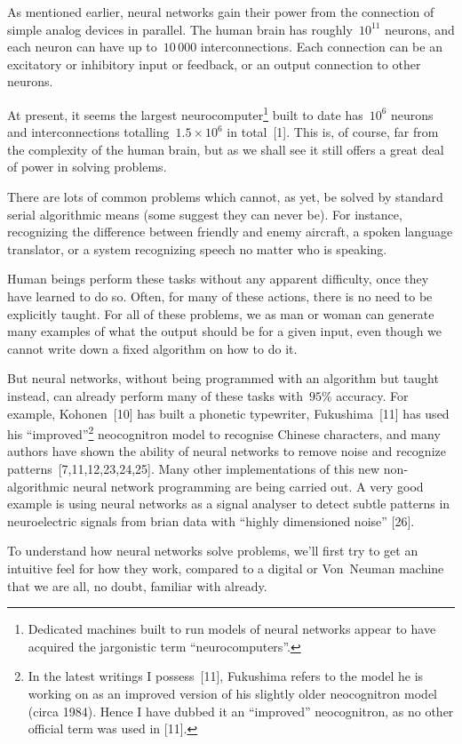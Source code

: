 \documentclass[12pt]{report}
\begin{document}
As mentioned earlier, neural networks gain their power from the connection of
simple analog devices in parallel.
The human brain has roughly~$10^{11}$ neurons, and each neuron %
can have up to~$10\,000$ interconnections.
Each connection can be an excitatory or inhibitory input or feedback, or
an output connection to other neurons.

At present, it seems the largest neurocomputer\footnote*{Dedicated
machines built to run models of neural networks appear to have acquired
the jargonistic term ``neurocomputers''.} built to date has~$10^6$
neurons and interconnections totalling~$1.5\times10^6$ in total~[1].
This is, of course, far from the complexity of the human brain, but as
we shall see it still offers a great deal of power in solving problems.

There are lots of common problems which cannot, as yet, be solved  by
standard serial algorithmic means (some suggest they can never be).
For instance, recognizing the difference between friendly and enemy
aircraft, a spoken language translator, or a system recognizing speech
no matter who is speaking.

Human beings perform these tasks without any apparent difficulty, once
they have learned to do so.
Often, for many of these actions, there is no need to be explicitly taught.
For all of these problems, we as man or woman can generate many examples 
of what the
output should be for a given input, even though we cannot write down a
fixed algorithm on how to do it.

But neural networks, without being programmed with an algorithm but taught instead,
can already perform many of these tasks with~$95\%$ accuracy. For
example, Kohonen~[10] has built a phonetic typewriter, Fukushima~[11]
has used his ``improved''\footnote*{In the latest writings I possess~[11],
Fukushima refers to the model he is working on as an improved version of
his slightly older neocognitron model (circa 1984). Hence I have dubbed it an
``improved'' neocognitron, as no other official term was used in
[11].} 
neocognitron model to recognise Chinese characters, and many
authors have shown the ability of neural networks to remove noise and recognize
patterns~[7,11,12,23,24,25].
Many other implementations of this new non-algorithmic neural network programming are
being carried out.
A very good example is using neural networks as a signal analyser to detect
subtle patterns in neuroelectric signals from brian data with ``highly
dimensioned noise'' [26].

To understand how neural networks solve problems, we'll first try to get an
intuitive feel for how they work, compared to a digital or Von~Neuman
machine that we are all, no doubt, familiar with already.
\end{document}
